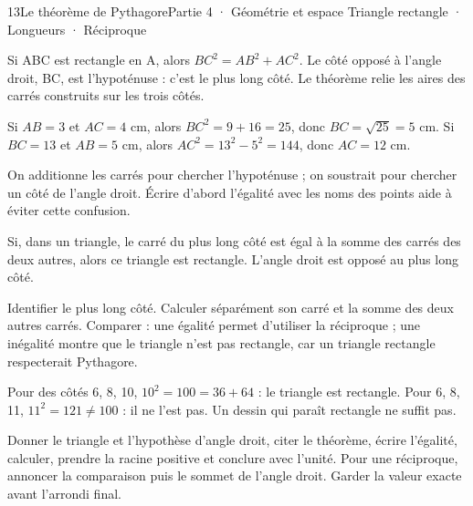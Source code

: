 \begin{ouverture}[geometrie]{13}{Le théorème de Pythagore}{Partie 4 · Géométrie et espace}
{Triangle rectangle · Longueurs · Réciproque}
\end{ouverture}
\pagestyle{otMain}\essentiel\fontsize{11}{15}\selectfont
{}\label{cours-13-1}
\begin{propriete}Si ABC est rectangle en A, alors $BC^2=AB^2+AC^2$. Le côté opposé à l’angle droit, BC, est l’hypoténuse : c’est le plus long côté. Le théorème relie les aires des carrés construits sur les trois côtés.\end{propriete}
\label{fig-cours-13-1-cours-pythagore}

\begin{exemple}Si $AB=3$ et $AC=4$ cm, alors $BC^2=9+16=25$, donc $BC=\sqrt{25}=5$ cm. Si $BC=13$ et $AB=5$ cm, alors $AC^2=13^2-5^2=144$, donc $AC=12$ cm.\end{exemple}
\begin{attention}On additionne les carrés pour chercher l’hypoténuse ; on soustrait pour chercher un côté de l’angle droit. Écrire d’abord l’égalité avec les noms des points aide à éviter cette confusion.\end{attention}
\clearpage
{}\label{cours-13-2}
\begin{propriete}[Réciproque]Si, dans un triangle, le carré du plus long côté est égal à la somme des carrés des deux autres, alors ce triangle est rectangle. L’angle droit est opposé au plus long côté.\end{propriete}
\begin{savoirfaire}Identifier le plus long côté. Calculer séparément son carré et la somme des deux autres carrés. Comparer : une égalité permet d’utiliser la réciproque ; une inégalité montre que le triangle n’est pas rectangle, car un triangle rectangle respecterait Pythagore.\end{savoirfaire}
\begin{exemple}Pour des côtés 6, 8, 10, $10^2=100=36+64$ : le triangle est rectangle. Pour 6, 8, 11, $11^2=121\ne100$ : il ne l’est pas. Un dessin qui paraît rectangle ne suffit pas.\end{exemple}
\begin{savoirfaire}[Rédiger]Donner le triangle et l’hypothèse d’angle droit, citer le théorème, écrire l’égalité, calculer, prendre la racine positive et conclure avec l’unité. Pour une réciproque, annoncer la comparaison puis le sommet de l’angle droit. Garder la valeur exacte avant l’arrondi final.\end{savoirfaire}


